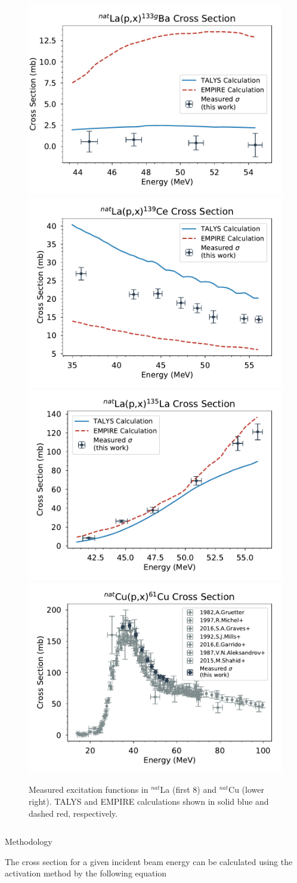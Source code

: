 \documentclass[final]{beamer}
\newlength{\onecolwid}
\newlength{\twocolwid}
\begin{document}
\begin{frame}[t]
\begin{columns}[t]
\begin{column}{\twocolwid}
\begin{figure}
\includegraphics[width=0.32\linewidth]{cross_sections/133BAg.pdf}\\
\includegraphics[width=0.32\linewidth]{cross_sections/139CE.pdf}
\includegraphics[width=0.32\linewidth]{cross_sections/135LA.pdf}
\includegraphics[width=0.32\linewidth]{cross_sections/61CU.pdf}
\caption{Measured excitation functions in $^{nat}$La (first 8) and $^{nat}$Cu (lower right).  TALYS and EMPIRE calculations shown in solid blue and dashed red, respectively.}
\end{figure}

\begin{columns}[t,totalwidth=\twocolwid] %
\begin{column}{\onecolwid} %
\begin{block}{Methodology}
\small{\hspace*{50pt}The cross section for a given incident beam energy can be calculated using the activation method by the following equation

}
\end{block}
\end{column}
\end{columns}
\end{column}
\end{columns}
\end{frame}
\end{document}
